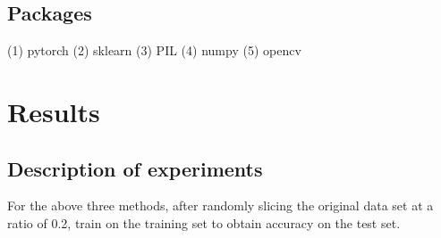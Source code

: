 \documentclass{article}
\begin{document}
  \subsection{Packages}
    (1) pytorch
    (2) sklearn
    (3) PIL
    (4) numpy
    (5) opencv

\section{Results}

  \subsection{Description of experiments}
  For the above three methods, after randomly slicing the original data set at a ratio of 0.2, train on the training set to obtain accuracy on the test set.
\end{document}
